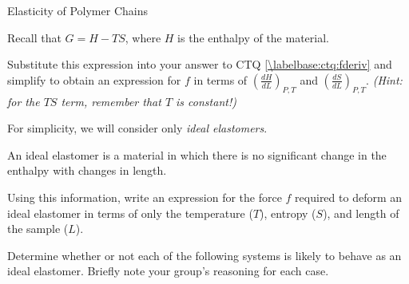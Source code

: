 \begin{activity}{Elasticity of Polymer Chains}
\begin{ctqs}
	\question Recall that $G = H - TS$, where $H$ is the enthalpy of the material.  
	
		Substitute this expression into your answer to CTQ \ref{\labelbase:ctq:fderiv} and simplify to obtain an expression for $f$ in terms of $\left(\frac{dH}{dL}\right)_{P,T}$ and $\left(\frac{dS}{dL}\right)_{P,T}$.  \emph{(Hint: for the $TS$ term, remember that $T$ is constant!)}
		
		\begin{solution}[1.25in]\end{solution}
		
		\label{\labelbase:ctq:fdSdL}
	
\end{ctqs}

\begin{infobox}
	
	For simplicity, we will consider only \emph{ideal elastomers}.
	
	An ideal elastomer is a material in which there is no significant change in the enthalpy with changes in length.
	
\end{infobox}

\begin{ctqs}

	\question Using this information, write an expression for the force $f$ required to deform an ideal elastomer in terms of only the temperature ($T$), entropy ($S$), and length of the sample ($L$).
		
		\begin{solution}[0.75in]\studentdisplay{~}\end{solution}
	
	\question Determine whether or not each of the following systems is likely to behave as an ideal elastomer.  Briefly note your group's reasoning for each case.
	

\end{ctqs}
\end{activity}
